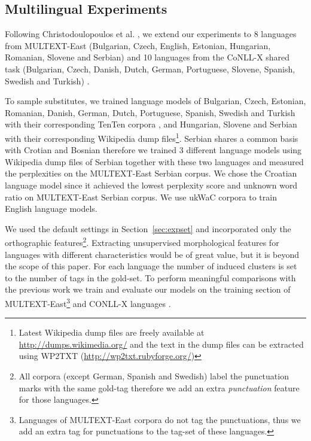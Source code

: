 \subsection{Multilingual Experiments}
\label{sec:multilang}
\noindent Following Christodoulopoulos et
al. , we extend our
experiments to 8 languages from MULTEXT-East (Bulgarian, Czech, English,
Estonian, Hungarian, Romanian, Slovene and Serbian) \cite{citeulike:5820223}
and 10 languages from the CoNLL-X shared task (Bulgarian, Czech, Danish, Dutch,
German, Portuguese, Slovene, Spanish, Swedish and Turkish)
\cite{Buchholz:2006:CST:1596276.1596305}.  

To sample substitutes, we trained language models of Bulgarian, Czech,
Estonian, Romanian, Danish, German, Dutch, Portuguese, Spanish, Swedish and
Turkish with their corresponding TenTen corpora \cite{jakubivcek2013tenten},
and Hungarian, Slovene and Serbian with their corresponding Wikipedia dump
files\footnote{Latest Wikipedia dump files are freely available at
  \url{http://dumps.wikimedia.org/} and the text in the dump files can be
  extracted using WP2TXT (\url{http://wp2txt.rubyforge.org/})}.  Serbian shares
  a common basis with Crotian and Bosnian therefore we trained 3 different
  language models using Wikipedia dump files of Serbian together with these two
  languages and measured the perplexities on the MULTEXT-East Serbian corpus.
  We chose the Croatian language model since it achieved the lowest perplexity
  score and unknown word ratio on MULTEXT-East Serbian corpus.  We use ukWaC
  corpora to train English language models. 

We used the default settings in Section~\ref{sec:expset} and incorporated only
the orthographic features\footnote{All corpora (except German, Spanish and
Swedish) label the punctuation marks with the same gold-tag therefore we add an
extra {\em punctuation} feature for those languages.}.  Extracting
unsupervised morphological features for languages with different
characteristics would be of great value, but it is beyond the scope of this
paper.  For each language the number of induced clusters is set to the number
of tags in the gold-set.  To perform meaningful comparisons with the previous
work we train and evaluate our models on the training section of
MULTEXT-East\footnote{Languages of MULTEXT-East corpora do not tag the
punctuations, thus we add an extra tag for punctuations to the tag-set of these
languages.} and CONLL-X languages \cite{Lee:2010:STU:1870658.1870741}.

